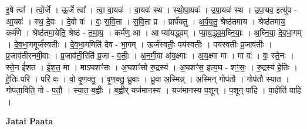 \documentclass[17pt]{extarticle}
\begin{document}
इ॒षे त्वा᳚ । त्वो॒र्जे । ऊ॒र्जे त्वा᳚ । त्वा॒ वा॒यवः॑ । वा॒यवः॑ स्थ । स्थो॒पा॒यवः॑ । उ॒पा॒यवः॑ स्थ । उ॒पा॒यव॒ इत्यु॑प - आ॒यवः॑ । 
स्थ॒ दे॒वः । दे॒वो वः॑ । वः॒ स॒वि॒ता । स॒वि॒ता प्र । प्रार्प॑यतु । अ॒र्प॒य॒तु॒ श्रेष्ठ॑तमाय । श्रेष्ठ॑तमाय॒ कर्म॑णे । श्रेष्ठ॑तमा॒येति॒ श्रेष्ठ॑ - त॒मा॒य॒ । कर्म॑ण॒ आ । आ प्या॑यद्ध्वम् । प्या॒य॒द्ध्व॒॒म॒घ्नि॒याः॒ । अ॒घ्नि॒या॒ दे॒व॒भा॒गम् । दे॒व॒भा॒गमूर्ज॑स्वतीः । दे॒व॒भा॒गमिति॑ देव - भा॒गम् । 
ऊर्ज॑स्वतीः॒ पय॑स्वतीः । पय॑स्वतीः प्र॒जाव॑तीः । 
प्र॒जाव॑तीरनमी॒वाः । प्र॒जाव॑ती॒रिति॑ प्र॒जा - व॒तीः॒ । अ॒न॒मी॒वा अ॑य॒क्ष्माः । अ॒य॒क्ष्मा मा । मा वः॑ । वः॒ स्ते॒नः । स्ते॒न ई॑शत । ई॒श॒त॒ मा । माऽघशꣳ॑सः । अ॒घशꣳ॑सो रु॒द्रस्य॑ । अ॒घशꣳ॑स॒ इत्य॒घ - शꣳ॒॒सः॒ । रु॒द्रस्य॑ हे॒तिः । हे॒तिः परि॑ । परि॑ वः । वो॒ वृ॒ण॒क्तु॒ । वृ॒ण॒क्तु॒ ध्रु॒वाः । ध्रु॒वा अ॒स्मिन्न् । अ॒स्मिन् गोप॑तौ । गोप॑तौ स्यात । गोप॑ता॒विति॒ गो - प॒तौ॒ । स्या॒त॒ ब॒ह्वीः । ब॒ह्वीर् यज॑मानस्य । यज॑मानस्य प॒शून् । प॒शून् पा॑हि । पा॒हीति॑ पाहि । \newline

\textbf{Jatai Paata} \newline
\end{document}
